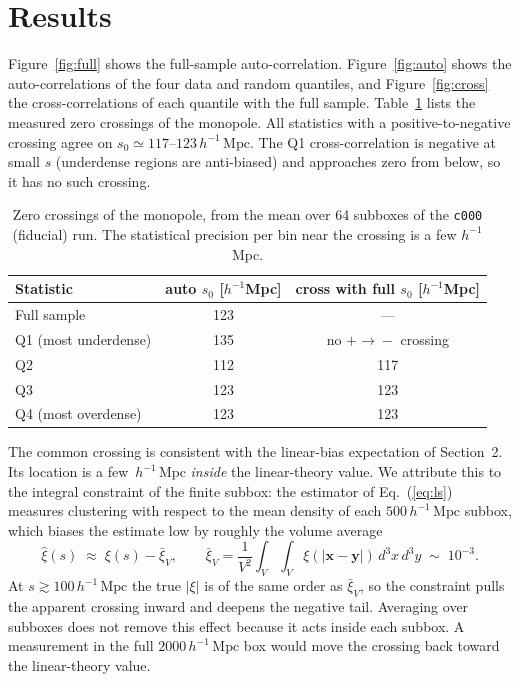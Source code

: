 \documentclass[11pt]{article}
\newcommand{\Mpch}{\,h^{-1}\,\mathrm{Mpc}}
\begin{document}
\section{Results}

Figure~\ref{fig:full} shows the full-sample auto-correlation.
Figure~\ref{fig:auto} shows the auto-correlations of the four data and
random quantiles, and Figure~\ref{fig:cross} the cross-correlations of
each quantile with the full sample.  Table~\ref{tab:crossings} lists the
measured zero crossings of the monopole.  All statistics with a
positive-to-negative crossing agree on $s_{0} \simeq 117$--$123\Mpch$.
The Q1 cross-correlation is negative at small $s$ (underdense regions are
anti-biased) and approaches zero from below, so it has no such crossing.

\begin{table}[ht]
\centering
\begin{tabular}{lcc}
\toprule
Statistic & auto $s_{0}$ [$h^{-1}$Mpc] & cross with full $s_{0}$ [$h^{-1}$Mpc] \\
\midrule
Full sample & 123 & --- \\
Q1 (most underdense) & 135 & no $+\!\to\!-$ crossing \\
Q2 & 112 & 117 \\
Q3 & 123 & 123 \\
Q4 (most overdense) & 123 & 123 \\
\bottomrule
\end{tabular}
\caption{Zero crossings of the monopole, from the mean over 64 subboxes
of the \texttt{c000} (fiducial) run.  The statistical precision per bin
near the crossing is a few $h^{-1}$Mpc.}
\label{tab:crossings}
\end{table}

The common crossing is consistent with the linear-bias expectation of
Section~2.  Its location is a few $\Mpch$ \emph{inside} the linear-theory
value.  We attribute this to the integral constraint of the finite subbox:
the estimator of Eq.~(\ref{eq:ls}) measures clustering with respect to the
mean density of each $500\Mpch$ subbox, which biases the estimate low by
roughly the volume average
\begin{equation}
\hat{\xi}(s) \;\approx\; \xi(s) - \bar{\xi}_{V},
\qquad
\bar{\xi}_{V} = \frac{1}{V^{2}} \int_{V}\!\!\int_{V}
\xi(|\mathbf{x}-\mathbf{y}|)\, d^{3}x\, d^{3}y
\;\sim\; 10^{-3}.
\label{eq:ic}
\end{equation}
At $s \gtrsim 100\Mpch$ the true $|\xi|$ is of the same order as
$\bar{\xi}_{V}$, so the constraint pulls the apparent crossing inward and
deepens the negative tail.  Averaging over subboxes does not remove this
effect because it acts inside each subbox.  A measurement in the full
$2000\Mpch$ box would move the crossing back toward the linear-theory
value.
\end{document}
